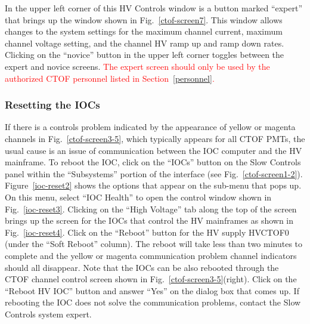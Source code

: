 \documentclass[12pt]{article}
\begin{document}
In the upper left corner of this HV Controls window is a button marked ``expert'' that brings up the window
shown in Fig.~\ref{ctof-screen7}. This window allows changes to the system settings for the maximum channel
current, maximum channel voltage setting, and the channel HV ramp up and ramp down rates. Clicking on the 
``novice'' button in the upper left corner toggles between the expert and novice screens. \textcolor{red}{The
expert screen should only be used by the authorized CTOF personnel listed in Section~\ref{personnel}.} 

\subsubsection{Resetting the IOCs}
\label{reset-iocs}

If there is a controls problem indicated by the appearance of yellow or magenta channels in
Fig.~\ref{ctof-screen3-5}, which typically appears for all CTOF PMTs, the usual cause is an issue of
communication between the IOC computer and the HV mainframe. To reboot the IOC, click on the ``IOCs''
button on the Slow Controls panel within the ``Subsystems'' portion of the interface (see
Fig.~\ref{ctof-screen1-2}). Figure~\ref{ioc-reset2} shows the options that appear on the sub-menu that
pops up. On this menu, select ``IOC Health'' to open the control window shown in Fig.~\ref{ioc-reset3}.
Clicking on the ``High Voltage'' tab along the top of the screen brings up the screen for the IOCs that
control the HV mainframes as shown in Fig.~\ref{ioc-reset4}. Click on the ``Reboot'' button for the HV
supply HVCTOF0 (under the ``Soft Reboot'' column). The reboot will take less than two minutes to complete
and the yellow or magenta communication problem channel indicators should all disappear. Note that the
IOCs can be also rebooted through the CTOF channel control screen shown in Fig.~\ref{ctof-screen3-5}(right).
Click on the ``Reboot HV IOC'' button and answer ``Yes'' on the dialog box that comes up. If rebooting
the IOC does not solve the communication problems, contact the Slow Controls system expert.
\end{document}
